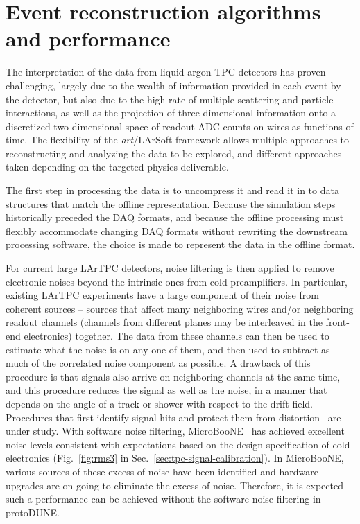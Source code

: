 \section{Event reconstruction algorithms and performance}
\label{sec:larsoftreco}

The interpretation of the data from liquid-argon TPC detectors has
proven challenging, largely due to the wealth of information provided
in each event by the detector, but also due to the high rate of
multiple scattering and particle interactions, as well as the
projection of three-dimensional information onto a discretized
two-dimensional space of readout ADC counts on wires as functions of
time.  The flexibility of the {\it{art}}/LArSoft framework allows
multiple approaches to reconstructing and analyzing the data to be
explored, and different approaches taken depending on the targeted
physics deliverable.

The first step in processing the data is to uncompress it and read it
in to data structures that match the offline representation.  Because
the simulation steps historically preceded the DAQ formats, and
because the offline processing must flexibly accommodate changing DAQ
formats without rewriting the downstream processing software, the
choice is made to represent the data in the offline format.


For current large LArTPC detectors, noise filtering is then applied to remove
electronic noises beyond the intrinsic ones from cold preamplifiers.
In particular, existing LArTPC experiments have a
large component of their noise from coherent sources -- sources that
affect many neighboring wires and/or neighboring readout channels
(channels from different planes may be interleaved in the front-end
electronics) together.  The data from these channels can then be used
to estimate what the noise is on any one of them, and then used to
subtract as much of the correlated noise component as possible.  A
drawback of this procedure is that signals also arrive on neighboring
channels at the same time, and this procedure reduces the signal as
well as the noise, in a manner that depends on the angle of a track or
shower with respect to the drift field.  Procedures that first
identify signal hits and protect them from distortion~\cite{microboone_noise} 
are under study. With software noise filtering, MicroBooNE~\cite{noise_filter}
has achieved excellent noise levels consistent with expectations based on 
the design specification of cold electronics (Fig.~\ref{fig:rms3} 
in Sec.~\ref{sec:tpc-signal-calibration}).  In MicroBooNE, various 
sources of these excess of noise have been identified and hardware upgrades 
are on-going to eliminate the excess of noise. Therefore, it is expected
such a performance can be achieved without the software noise filtering in
protoDUNE.

